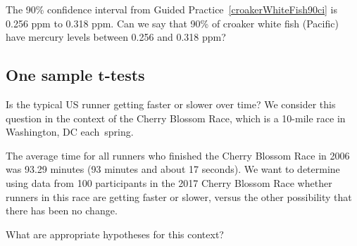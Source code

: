 \begin{exercisewrap}
\begin{nexercise}
The 90\% confidence interval from
Guided Practice~\ref{croakerWhiteFish90ci}
is 0.256 ppm to 0.318 ppm.
Can we say that 90\% of croaker white fish (Pacific)
have mercury levels between 0.256 and 0.318 ppm?\footnotemark{}
\end{nexercise}
\end{exercisewrap}




\subsection{One sample $\mathbf{t}$-tests}
\label{oneSampleTTests}

\newcommand{\cherryblossomn}{100}
\newcommand{\cherryblossommean}{97.32}
\newcommand{\cherryblossomnull}{93.29}
\newcommand{\cherryblossomsd}{16.98}
\newcommand{\cherryblossomse}{1.70}
\newcommand{\cherryblossomz}{2.37}

\noindent%
Is the typical US runner getting faster or slower over time? We consider this question in the context of the Cherry Blossom Race, which is a 10-mile race in Washington, DC each~spring.

The average time for all runners who finished the Cherry Blossom Race in 2006 was 93.29 minutes (93 minutes and about 17 seconds). We want to determine using data from \cherryblossomn{} participants in the 2017 Cherry Blossom Race whether runners in this race are getting faster or slower, versus the other possibility that there has been no change.

\begin{exercisewrap}
\begin{nexercise}
What are appropriate hypotheses for this context?\footnotemark{}
\end{nexercise}
\end{exercisewrap}

